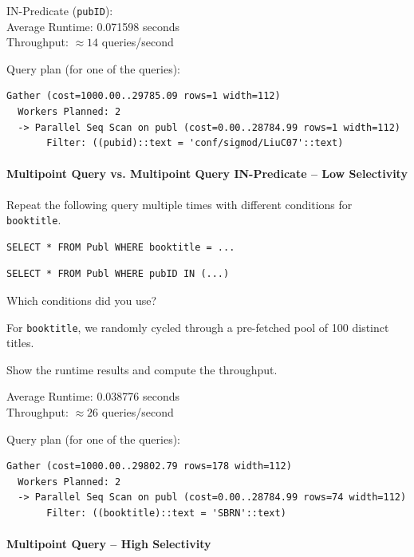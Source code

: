 \documentclass[11pt]{scrartcl}
\begin{document}
\vspace{0.5em}
IN-Predicate (\texttt{pubID}): \\
Average Runtime: 0.071598 seconds \\
Throughput: $\approx 14$ queries/second

Query plan (for one of the queries):

{\small
\parskip0pt\begin{verbatim}
Gather (cost=1000.00..29785.09 rows=1 width=112)
  Workers Planned: 2
  -> Parallel Seq Scan on publ (cost=0.00..28784.99 rows=1 width=112)
       Filter: ((pubid)::text = 'conf/sigmod/LiuC07'::text)
\end{verbatim}}

\paragraph{Multipoint Query vs. Multipoint Query IN-Predicate -- Low Selectivity}

Repeat the following query multiple times with different conditions for \texttt{booktitle}.

\begin{lstlisting}[style=dbtsql]
SELECT * FROM Publ WHERE booktitle = ...
\end{lstlisting}

\begin{lstlisting}[style=dbtsql]
SELECT * FROM Publ WHERE pubID IN (...)
\end{lstlisting}

Which conditions did you use?

For \texttt{booktitle}, we randomly cycled through a pre-fetched pool of 100 distinct titles.

Show the runtime results and compute the throughput.

Average Runtime: 0.038776 seconds \\
Throughput: $\approx 26$ queries/second

Query plan (for one of the queries):

{\small
\parskip0pt\begin{verbatim}
Gather (cost=1000.00..29802.79 rows=178 width=112)
  Workers Planned: 2
  -> Parallel Seq Scan on publ (cost=0.00..28784.99 rows=74 width=112)
       Filter: ((booktitle)::text = 'SBRN'::text)
\end{verbatim}}

\paragraph{Multipoint Query -- High Selectivity}
\end{document}
